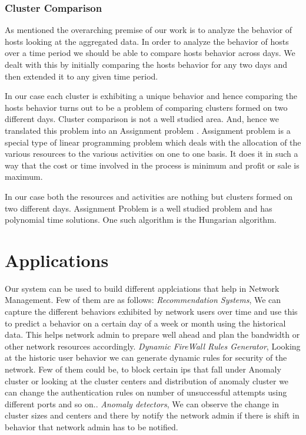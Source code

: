 \subsubsection*{Cluster Comparison}
As mentioned the overarching premise of our work is to analyze the behavior of hosts looking at the aggregated data. In order to analyze the behavior of hosts over a time period we should be able to compare hosts behavior across days. We dealt with this by initially comparing the hosts behavior for any two days and then extended it to any given time period.

In our case each cluster is exhibiting a unique behavior and hence comparing the hosts behavior turns out to be a problem of comparing clusters formed on two different days. Cluster comparison is not a well studied area. And, hence we translated this problem into an Assignment problem \cite{kuhn1955hungarian}. Assignment problem is a special type of linear programming problem which deals with the allocation of the various resources to the various activities on one to one basis. It does it in such a way that the cost or time involved in the process is minimum and profit or sale is maximum. 

In our case both the resources and activities are nothing but clusters formed on two different days. Assignment Problem is a well studied problem and has polynomial time solutions. One such algorithm is the Hungarian algorithm. 

\section{Applications}
Our system can be used to build different applciations that help in Network Management. Few of them are as follows:
\textit{Recommendation Systems}, We can capture the different behaviors exhibited by network users over time and use this to predict a behavior on a certain day of a week or month using the historical data. This helps network admin to prepare well ahead and plan the bandwidth or other network resources accordingly.
\textit{Dynamic FireWall Rules Generator}, Looking at the historic user behavior we can generate dynamic rules for security of the network. Few of them could be, to block certain ips that fall under Anomaly cluster or looking at the cluster centers and distribution of anomaly cluster we can change the authentication rules on number of unsuccessful attempts using different ports and so on..
\textit{Anomaly detectors}, We can observe the change in cluster sizes and centers and there by notify the network admin if there is shift in behavior that network admin has to be notified. 




